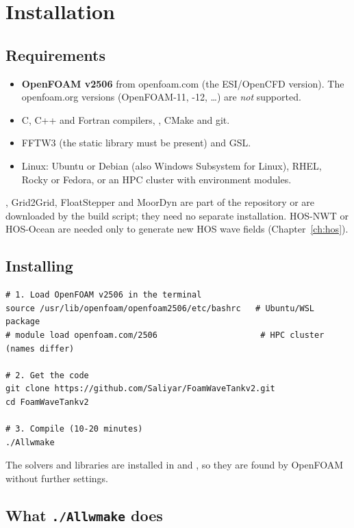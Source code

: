 \chapter{Installation}
\label{ch:install}

\section{Requirements}
\begin{itemize}
  \item \textbf{OpenFOAM v2506} from openfoam.com (the ESI/OpenCFD version). The
        openfoam.org versions (OpenFOAM-11, -12, \ldots) are \emph{not} supported.
  \item C, C++ and Fortran compilers, , CMake and git.
  \item FFTW3 (the static library  must be present) and GSL.
  \item Linux: Ubuntu or Debian (also Windows Subsystem for Linux), RHEL, Rocky or Fedora,
        or an HPC cluster with environment modules.
\end{itemize}
\wtwof{}, Grid2Grid, FloatStepper and MoorDyn are part of the repository or are downloaded
by the build script; they need no separate installation. HOS-NWT or HOS-Ocean are needed
only to generate new HOS wave fields (Chapter~\ref{ch:hos}).

\section{Installing}
\begin{lstlisting}[style=shell,caption={Installing FoamWaveTank.},label={lst:install}]
# 1. Load OpenFOAM v2506 in the terminal
source /usr/lib/openfoam/openfoam2506/etc/bashrc   # Ubuntu/WSL package
# module load openfoam.com/2506                     # HPC cluster (names differ)

# 2. Get the code
git clone https://github.com/Saliyar/FoamWaveTankv2.git
cd FoamWaveTankv2

# 3. Compile (10-20 minutes)
./Allwmake
\end{lstlisting}

The solvers and libraries are installed in  and
, so they are found by OpenFOAM without further settings.

\section{What \texttt{./Allwmake} does}
